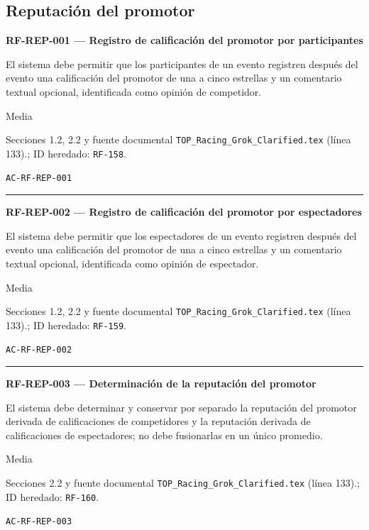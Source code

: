 \documentclass[10pt,letterpaper]{article}
\begin{document}
\subsection{Reputación del promotor}
\noindent\textbf{RF-REP-001 --- Registro de calificación del promotor por participantes}\par
\begin{description}[style=nextline,leftmargin=3.15cm,labelwidth=2.8cm,font=\normalfont\bfseries]
\item[Obligación] El sistema debe permitir que los participantes de un evento registren después del evento una calificación del promotor de una a cinco estrellas y un comentario textual opcional, identificada como opinión de competidor.
\item[Prioridad] Media
\item[Procedencia] Secciones 1.2, 2.2 y fuente documental \texttt{TOP\_Racing\_Grok\_Clarified.tex} (línea 133).; ID heredado: \texttt{RF-158}.
\item[Verificación] \texttt{AC-RF-REP-001}
\end{description}
\vspace{0.25em}\hrule\vspace{0.65em}
\noindent\textbf{RF-REP-002 --- Registro de calificación del promotor por espectadores}\par
\begin{description}[style=nextline,leftmargin=3.15cm,labelwidth=2.8cm,font=\normalfont\bfseries]
\item[Obligación] El sistema debe permitir que los espectadores de un evento registren después del evento una calificación del promotor de una a cinco estrellas y un comentario textual opcional, identificada como opinión de espectador.
\item[Prioridad] Media
\item[Procedencia] Secciones 1.2, 2.2 y fuente documental \texttt{TOP\_Racing\_Grok\_Clarified.tex} (línea 133).; ID heredado: \texttt{RF-159}.
\item[Verificación] \texttt{AC-RF-REP-002}
\end{description}
\vspace{0.25em}\hrule\vspace{0.65em}
\noindent\textbf{RF-REP-003 --- Determinación de la reputación del promotor}\par
\begin{description}[style=nextline,leftmargin=3.15cm,labelwidth=2.8cm,font=\normalfont\bfseries]
\item[Obligación] El sistema debe determinar y conservar por separado la reputación del promotor derivada de calificaciones de competidores y la reputación derivada de calificaciones de espectadores; no debe fusionarlas en un único promedio.
\item[Prioridad] Media
\item[Procedencia] Secciones 2.2 y fuente documental \texttt{TOP\_Racing\_Grok\_Clarified.tex} (línea 133).; ID heredado: \texttt{RF-160}.
\item[Verificación] \texttt{AC-RF-REP-003}
\end{description}
\end{document}
